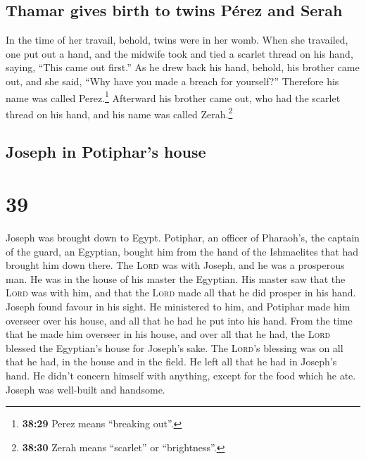 \hypertarget{thamar-gives-birth-to-twins-puxe9rez-and-serah}{%
\subsection{Thamar gives birth to twins Pérez and
Serah}\label{thamar-gives-birth-to-twins-puxe9rez-and-serah}}

 In the time of her travail, behold, twins were in her
womb.  When she travailed, one put out a hand, and the
midwife took and tied a scarlet thread on his hand, saying, ``This came
out first.''  As he drew back his hand, behold, his
brother came out, and she said, ``Why have you made a breach for
yourself?'' Therefore his name was called Perez.\footnote{\textbf{38:29}
  Perez means ``breaking out''.}  Afterward his brother
came out, who had the scarlet thread on his hand, and his name was
called Zerah.\footnote{\textbf{38:30} Zerah means ``scarlet'' or
  ``brightness''.}

\hypertarget{joseph-in-potiphars-house}{%
\subsection{Joseph in Potiphar's
house}\label{joseph-in-potiphars-house}}

\hypertarget{section-38}{%
\section{39}\label{section-38}}

 Joseph was brought down to Egypt. Potiphar, an officer of
Pharaoh's, the captain of the guard, an Egyptian, bought him from the
hand of the Ishmaelites that had brought him down there. 
The \textsc{Lord} was with Joseph, and he was a prosperous man. He was
in the house of his master the Egyptian.  His master saw
that the \textsc{Lord} was with him, and that the \textsc{Lord} made all
that he did prosper in his hand.  Joseph found favour in
his sight. He ministered to him, and Potiphar made him overseer over his
house, and all that he had he put into his hand.  From the
time that he made him overseer in his house, and over all that he had,
the \textsc{Lord} blessed the Egyptian's house for Joseph's sake. The
\textsc{Lord}'s blessing was on all that he had, in the house and in the
field.  He left all that he had in Joseph's hand. He
didn't concern himself with anything, except for the food which he ate.
Joseph was well-built and handsome.

